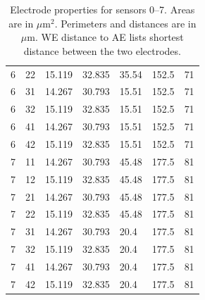 \begin{table}
\begin{tabular}{lllllll}
		6 & 22 & 15.119 & 32.835 & 35.54 & 152.5 & 71 \\
		6 & 31 & 14.267 & 30.793 & 15.51 & 152.5 & 71 \\
		6 & 32 & 15.119 & 32.835 & 15.51 & 152.5 & 71 \\
		6 & 41 & 14.267 & 30.793 & 15.51 & 152.5 & 71 \\
		6 & 42 & 15.119 & 32.835 & 15.51 & 152.5 & 71 \\
		7 & 11 & 14.267 & 30.793 & 45.48 & 177.5 & 81 \\
		7 & 12 & 15.119 & 32.835 & 45.48 & 177.5 & 81 \\
		7 & 21 & 14.267 & 30.793 & 45.48 & 177.5 & 81 \\
		7 & 22 & 15.119 & 32.835 & 45.48 & 177.5 & 81 \\
		7 & 31 & 14.267 & 30.793 & 20.4 & 177.5 & 81 \\
		7 & 32 & 15.119 & 32.835 & 20.4 & 177.5 & 81 \\
		7 & 41 & 14.267 & 30.793 & 20.4 & 177.5 & 81 \\
		7 & 42 & 15.119 & 32.835 & 20.4 & 177.5 & 81
	\end{tabular}
	\caption[Electrode properties for sensors 0--7]{Electrode properties for sensors 0--7. Areas are in $\mu \mathrm{m}^2$. Perimeters and distances are in $\mu \mathrm{m}$. WE distance to AE lists shortest distance between the two electrodes.}
	\label{electrode-properties-1}
\end{table}

